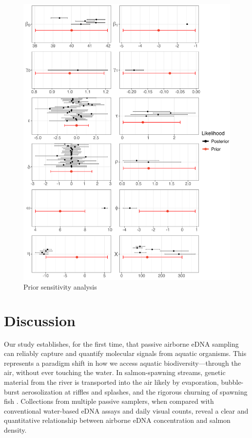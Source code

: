 \documentclass{article}
\begin{document}
\begin{figure}[tbhp] 
\centering
\includegraphics[width=16.5cm]{Plots/Diagnostic_Fig_2.jpg}  
\caption{Prior sensitivity analysis}
\label{fig:prior_sens}
\end{figure}

\section{Discussion}
Our study establishes, for the first time, that passive airborne eDNA sampling can reliably capture and quantify molecular signals from aquatic organisms. This represents a paradigm shift in how we access aquatic biodiversity—through the air, without ever touching the water. In salmon-spawning streams, genetic material from the river is transported into the air likely by evaporation, bubble-burst aerosolization at riffles and splashes, and the rigorous churning of spawning fish \cite{wood2021,prather2013}. Collections from multiple passive samplers, when compared with conventional water-based eDNA assays and daily visual counts, reveal a clear and quantitative relationship between airborne eDNA concentration and salmon density. 
\end{document}
